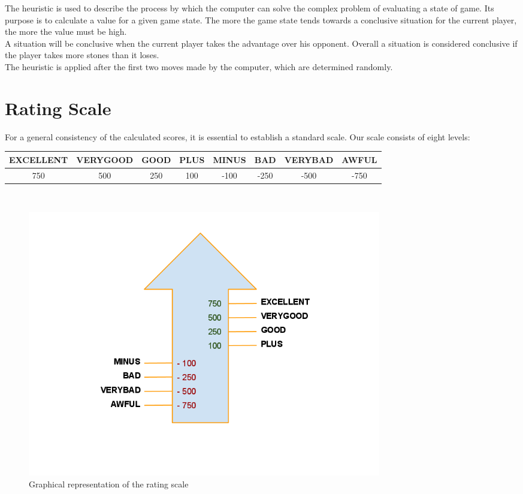 \documentclass[11pt,a4paper]{report}
\begin{document}
The heuristic is used to describe the process by which the computer can solve the complex problem of evaluating a state of game.
Its purpose is to calculate a value for a given game state. The more the game state tends towards a conclusive situation for the current player, the more the value must be high.\\

A situation will be conclusive when the current player takes the advantage over his opponent.
Overall a situation is considered conclusive if the player takes more stones than it loses.\\

The heuristic is applied after the first two moves made by the computer, which are determined randomly.\\
\newpage 

\section*{Rating Scale}

For a general consistency of the calculated scores, it is essential to establish a standard scale. Our scale consists of eight levels:\\

\begin{tabular}{|c|c|c|c|c|c|c|c|}
\hline EXCELLENT & VERYGOOD & GOOD & PLUS & MINUS & BAD & VERYBAD & AWFUL \\ 
\hline 750 & 500 & 250 & 100 & -100 & -250 & -500 & -750 \\ 
\hline 
\end{tabular} \\

\begin{figure}[h]
\centering
\includegraphics[width=0.75\textwidth]{images/Rating_Scale.png}
\caption{Graphical representation of the rating scale}
\label{rating_scale}
\end{figure}
\end{document}
